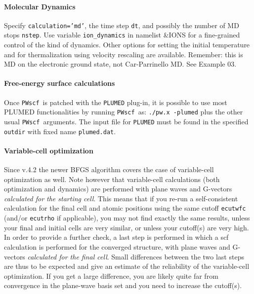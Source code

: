 \documentclass[12pt,a4paper]{article}
\def\PWscf{\texttt{PWscf}}
\begin{document}
\paragraph{Molecular Dynamics} 
Specify \texttt{calculation='md'}, the time step \texttt{dt}, and possibly the number of MD stops \texttt{nstep}.
Use variable \texttt{ion\_dynamics} in namelist \&IONS for a fine-grained control
of the kind of dynamics. Other options for setting the initial
temperature and for thermalization using velocity rescaling are
available. Remember: this is MD on the electronic ground state, not
Car-Parrinello MD.
See Example 03.

\paragraph{Free-energy surface calculations}

Once \PWscf\ is patched with the \texttt{PLUMED} plug-in, it is possible to 
use most PLUMED functionalities by running \PWscf\ as: 
\texttt{./pw.x -plumed} plus the other usual \PWscf\ arguments.
The input file for \texttt{PLUMED} must be found in the specified 
\texttt{outdir} with fixed name \texttt{plumed.dat}.

\paragraph{Variable-cell optimization}

Since v.4.2 the newer BFGS algorithm covers the case of variable-cell
optimization as well. Note however that variable-cell calculations
(both optimization and dynamics) are performed with plane waves and 
G-vectors {\em calculated for the starting cell}. This means that if 
you re-run a self-consistent calculation for the final cell and atomic 
positions using the same cutoff \texttt{ecutwfc} (and/or \texttt{ecutrho} 
if applicable), you may not find exactly the same results, unless your
final and initial cells are very similar, or unless your cutoff(s) are very
high. In order to provide a further check, a last step is performed in
which a scf calculation is performed for the converged structure, with
plane waves and G-vectors {\em calculated for the final cell}. Small 
differences between the two last steps are thus to be expected and give
an estimate of the reliability of the variable-cell optimization.
If you get a large difference, you are likely quite far from convergence
in the plane-wave basis set and you need to increase the cutoff(s).
\end{document}
